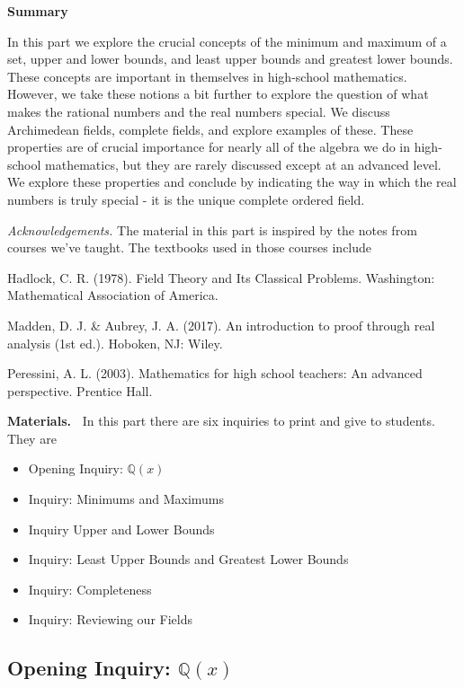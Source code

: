 \documentclass[11pt]{article}
\newcommand\header[1]{\vspace*{4pt}\par {\large {\bf #1}}\par}
\newenvironment{bignote}[1][Instructor note]%
	{\begin{mdframed}\raggedright{\bf #1.~}}
	{\end{mdframed}}
\theoremstyle{definition}
\begin{document}
\header{Summary}

In this part we explore the crucial concepts of the minimum and maximum of a set,
upper and lower bounds, and least upper bounds and greatest lower bounds. These concepts are important
in themselves in high-school mathematics. However, we take these notions a bit further to explore
the question of what makes the rational numbers and the real numbers special.
We discuss Archimedean fields, complete fields, and explore examples of these. These properties are
of crucial importance for nearly all of the algebra we do in high-school mathematics, but they are rarely
discussed except at an advanced level. We explore these properties and conclude by indicating the way in
which the real numbers is truly special - it is the unique complete ordered field.

{\it Acknowledgements.}  The material in this part is inspired by the notes from courses we've taught. The textbooks used in those courses include

Hadlock, C. R. (1978). Field Theory and Its Classical Problems. Washington: Mathematical Association of America.

Madden, D. J. \& Aubrey, J. A. (2017). An introduction to proof through real analysis (1st ed.). Hoboken, NJ: Wiley.

Peressini, A. L. (2003). Mathematics for high school teachers: An advanced perspective. Prentice Hall.

\newpage
\begin{bignote}[Materials]
  In this part there are six inquiries to print and give to students. They are
\begin{itemize}
  \item Opening Inquiry: $\mathbb{Q}(x)$
  \item Inquiry: Minimums and Maximums
  \item Inquiry Upper and Lower Bounds
  \item Inquiry: Least Upper Bounds and Greatest Lower Bounds
  \item Inquiry: Completeness
  \item Inquiry: Reviewing our Fields
\end{itemize}
\end{bignote}


\subsection{Opening Inquiry: $\mathbb{Q}(x)$}
\end{document}
